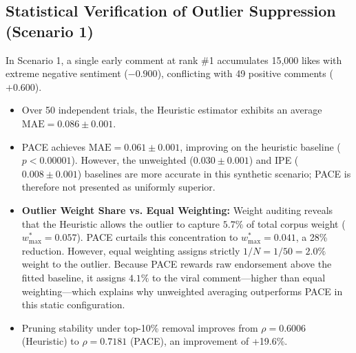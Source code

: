 \documentclass[journal]{IEEEtran}
\begin{document}
\subsection{Statistical Verification of Outlier Suppression (Scenario 1)}
In Scenario 1, a single early comment at rank \#1 accumulates 15,000 likes with extreme negative sentiment ($-0.900$), conflicting with 49 positive comments ($+0.600$).
\begin{itemize}
    \item Over 50 independent trials, the Heuristic estimator exhibits an average $\text{MAE} = 0.086 \pm 0.001$.
    \item PACE achieves $\text{MAE} = 0.061 \pm 0.001$, improving on the heuristic baseline ($p < 0.00001$). However, the unweighted ($0.030 \pm 0.001$) and IPE ($0.008 \pm 0.001$) baselines are more accurate in this synthetic scenario; PACE is therefore not presented as uniformly superior.
    \item \textbf{Outlier Weight Share vs. Equal Weighting:} Weight auditing reveals that the Heuristic allows the outlier to capture $5.7\%$ of total corpus weight ($w_{\max}^* = 0.057$). PACE curtails this concentration to $w_{\max}^* = 0.041$, a 28\% reduction. However, equal weighting assigns strictly $1/N = 1/50 = 2.0\%$ weight to the outlier. Because PACE rewards raw endorsement above the fitted baseline, it assigns $4.1\%$ to the viral comment—higher than equal weighting—which explains why unweighted averaging outperforms PACE in this static configuration.
    \item Pruning stability under top-10\% removal improves from $\rho = 0.6006$ (Heuristic) to $\rho = 0.7181$ (PACE), an improvement of +19.6\%.
\end{itemize}
\end{document}
